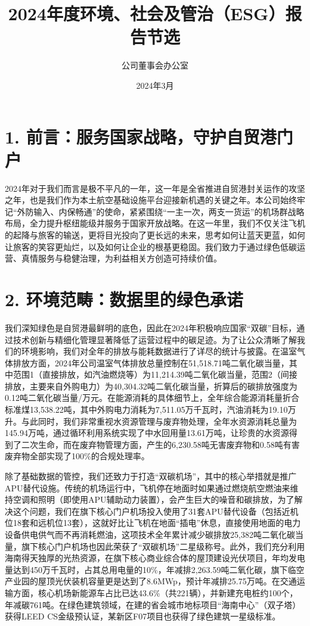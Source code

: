 \documentclass[a4paper,12pt]{article}
\title{\textbf{2024年度环境、社会及管治（ESG）报告节选}}
\author{公司董事会办公室}
\date{2024年3月}
\begin{document}
\maketitle

\section{1. 前言：服务国家战略，守护自贸港门户}

2024年对于我们而言是极不平凡的一年，这一年是全省推进自贸港封关运作的攻坚之年，也是我们作为本土航空基础设施平台迎接新机遇的关键之年。本公司始终牢记“外防输入、内保畅通”的使命，紧紧围绕“一主一次，两支一货运”的机场群战略布局，全力提升枢纽能级并服务于国家开放战略。在这一年里，我们不仅关注飞机的起降与旅客的输送，更将目光投向了更长远的未来，思考如何让蓝天更蓝，如何让旅客的笑容更灿烂，以及如何让企业的根基更稳固。我们致力于通过绿色低碳运营、真情服务与稳健治理，为利益相关方创造可持续价值。

\section{2. 环境范畴：数据里的绿色承诺}

我们深知绿色是自贸港最鲜明的底色，因此在2024年积极响应国家“双碳”目标，通过技术创新与精细化管理显著降低了运营过程中的碳足迹。为了让公众清晰了解我们的环境影响，我们对全年的排放与能耗数据进行了详尽的统计与披露。在温室气体排放方面，2024年公司温室气体排放总量控制在51,518.71吨二氧化碳当量，其中范围1（直接排放，如汽油燃烧等）为11,214.39吨二氧化碳当量，范围2（间接排放，主要来自外购电力）为40,304.32吨二氧化碳当量，折算后的碳排放强度为0.12吨二氧化碳当量/万元。在能源消耗的具体细节上，全年综合能源消耗量折合标准煤13,538.22吨，其中外购电力消耗为7,511.05万千瓦时，汽油消耗为19.10万升。与此同时，我们非常重视水资源管理与废弃物处理，全年水资源消耗总量为145.94万吨，通过循环利用系统实现了中水回用量13.61万吨，让珍贵的水资源得到了二次生命，而在废弃物管理方面，产生的6,230.58吨无害废弃物和0.58吨有害废弃物全部实现了100\%的合规处理率。

除了基础数据的管控，我们还致力于打造“双碳机场”，其中的核心举措就是推广APU替代设施。传统的机场运行中，飞机停在地面时如果通过燃烧航空燃油来维持空调和照明（即使用APU辅助动力装置），会产生巨大的噪音和碳排放，为了解决这个问题，我们在旗下核心门户机场投入使用了31套APU替代设备（包括近机位18套和远机位13套），这就好比让飞机在地面“插电”休息，直接使用地面的电力设备供电供气而不再消耗燃油，这项技术全年累计减少碳排放25,382吨二氧化碳当量，旗下核心门户机场也因此荣获了“双碳机场”二星级称号。此外，我们充分利用海南得天独厚的光热资源，在旗下核心商业综合体的屋顶建设光伏项目，年均发电量达到450万千瓦时，占其总用电量的10\%，年减排2,263.59吨二氧化碳，旗下临空产业园的屋顶光伏装机容量更是达到了8.6MWp，预计年减排25.75万吨。在交通运输方面，核心机场新能源车占比已达43.6\%（共221辆），并新建充电桩约100个，年减碳761吨。在绿色建筑领域，在建的省会城市地标项目“海南中心”（双子塔）获得LEED CS金级预认证，某新区F07项目也获得了绿色建筑一星级标准。
\end{document}
